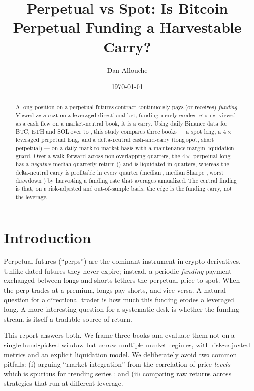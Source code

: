 \documentclass[11pt]{article}
\title{\textbf{Perpetual vs Spot: Is Bitcoin Perpetual Funding a Harvestable Carry?}}
\author{Dan Allouche}
\date{\today}
\begin{document}
\maketitle

\begin{abstract}
\noindent A long position on a perpetual futures contract continuously pays (or
receives) \emph{funding}. Viewed as a cost on a leveraged directional bet, funding
merely erodes returns; viewed as a cash flow on a market-neutral book, it is a
carry. Using daily Binance data for BTC, ETH and SOL over \dataStart{} to
\dataEnd{}, this study compares three books --- a spot long, a $4\times$ leveraged
perpetual long, and a delta-neutral cash-and-carry (long spot, short perpetual) ---
on a daily mark-to-market basis with a maintenance-margin liquidation guard. Over a
walk-forward across \nQuarters{} non-overlapping quarters, the $4\times$ perpetual
long has a \emph{negative} median quarterly return (\wfPerpMed{}) and is liquidated
in \wfPerpLiq{} quarters, whereas the delta-neutral carry is profitable in every
quarter (median \wfCarryMed{}, median Sharpe \wfCarrySharpe{}, worst drawdown
\wfCarryMdd{}) by harvesting a funding rate that averages \fundingAPR{} annualized.
The central finding is that, on a risk-adjusted and out-of-sample basis, the edge
is the funding carry, not the leverage.
\end{abstract}

\section{Introduction}
Perpetual futures (``perps'') are the dominant instrument in crypto derivatives.
Unlike dated futures they never expire; instead, a periodic \emph{funding} payment
exchanged between longs and shorts tethers the perpetual price to spot. When the
perp trades at a premium, longs pay shorts, and vice versa. A natural question for
a directional trader is how much this funding erodes a leveraged long. A more
interesting question for a systematic desk is whether the funding stream is itself
a tradable source of return.

This report answers both. We frame three books and evaluate them not on a single
hand-picked window but across multiple market regimes, with risk-adjusted metrics
and an explicit liquidation model. We deliberately avoid two common pitfalls: (i)
arguing ``market integration'' from the correlation of price \emph{levels}, which
is spurious for trending series \cite{yule1926,grangernewbold1974}; and (ii)
comparing raw returns across strategies that run at different leverage.
\end{document}
